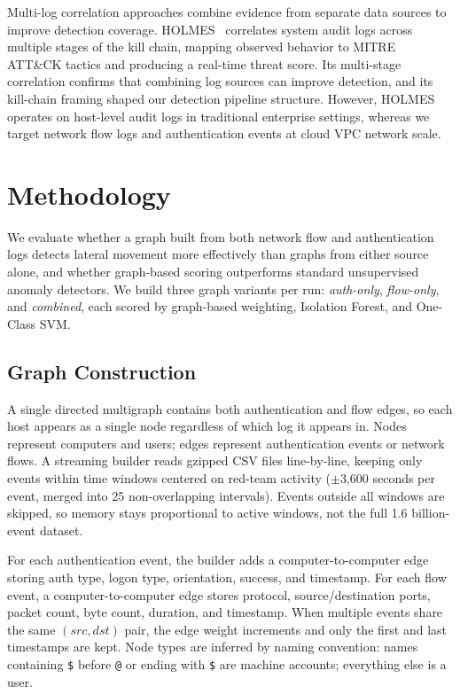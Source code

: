 \documentclass[letterpaper,twocolumn,10pt]{article}
\begin{document}
Multi-log correlation approaches combine evidence from separate data sources to improve detection coverage. HOLMES~\cite{holmes2019} correlates system audit logs across multiple stages of the kill chain, mapping observed behavior to MITRE ATT\&CK tactics and producing a real-time threat score. Its multi-stage correlation confirms that combining log sources can improve detection, and its kill-chain framing shaped our detection pipeline structure. However, HOLMES operates on host-level audit logs in traditional enterprise settings, whereas we target network flow logs and authentication events at cloud VPC network scale.

\section{Methodology}

We evaluate whether a graph built from both network flow and authentication logs detects lateral movement more effectively than graphs from either source alone, and whether graph-based scoring outperforms standard unsupervised anomaly detectors. We build three graph variants per run: \emph{auth-only}, \emph{flow-only}, and \emph{combined}, each scored by graph-based weighting, Isolation Forest, and One-Class SVM.

\subsection{Graph Construction}

A single directed multigraph contains both authentication and flow edges, so each host appears as a single node regardless of which log it appears in. Nodes represent computers and users; edges represent authentication events or network flows. A streaming builder reads gzipped CSV files line-by-line, keeping only events within time windows centered on red-team activity ($\pm$3,600 seconds per event, merged into 25 non-overlapping intervals). Events outside all windows are skipped, so memory stays proportional to active windows, not the full 1.6 billion-event dataset.

For each authentication event, the builder adds a computer-to-computer edge storing auth type, logon type, orientation, success, and timestamp. For each flow event, a computer-to-computer edge stores protocol, source/destination ports, packet count, byte count, duration, and timestamp. When multiple events share the same $(src, dst)$ pair, the edge weight increments and only the first and last timestamps are kept. Node types are inferred by naming convention: names containing \texttt{\$} before \texttt{@} or ending with \texttt{\$} are machine accounts; everything else is a user.
\end{document}
